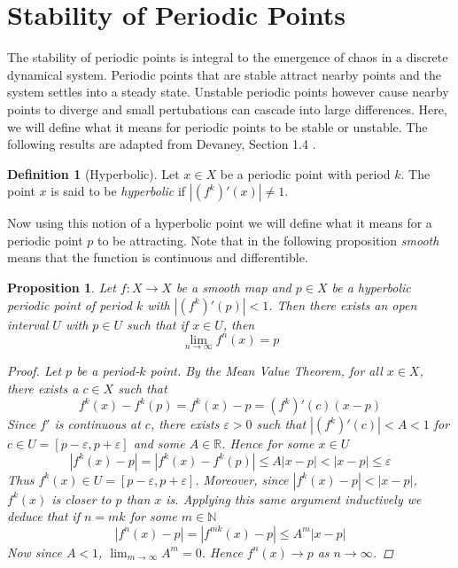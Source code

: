 \documentclass[11pt,a4paper,oneside]{memoir}
\theoremstyle{plain}
\newtheorem{prop}[thm]{Proposition}
\theoremstyle{definition}
\newtheorem{defn}[thm]{Definition}
\begin{document}
\section{Stability of Periodic Points}
The stability of periodic points is integral to the emergence of chaos in a discrete dynamical system. Periodic points that are stable attract nearby points and the system settles into a steady state. Unstable periodic points however cause nearby points to diverge and small pertubations can cascade into large differences. Here, we will define what it means for periodic points to be stable or unstable. The following results are adapted from Devaney, Section 1.4 \cite{devaney}.

\begin{defn}[Hyperbolic]
    Let $x \in X$ be a periodic point with period $k$. The point $x$ is said to be \emph{hyperbolic} if $|(f^k)'(x)| \neq 1$.
\end{defn}

Now using this notion of a hyperbolic point we will define what it means for a periodic point $p$ to be attracting. Note that in the following proposition \emph{smooth} means that the function is continuous and differentible.

\begin{prop} \label{prop:attractor}
    Let $f: X \to X$ be a smooth map and $p \in X$ be a hyperbolic periodic point of period $k$ with $|(f^k)'(p)| < 1$. Then there exists an open interval $U$ with $p \in U$ such that if $x \in U$, then \[ \lim_{n \to \infty} f^n(x) = p \]

    \begin{proof}
        Let $p$ be a period-$k$ point. By the Mean Value Theorem, for all $x \in X$, there exists a $c \in X$ such that \[f^k(x) - f^k(p) = f^k(x) - p = (f^k)'(c)(x-p)\] Since $f'$ is continuous at $c$, there exists $\varepsilon > 0$ such that $|(f^k)'(c)| < A < 1$ for $c \in U = [p - \varepsilon, p + \varepsilon]$ and some $A \in \mathbb{R}$. Hence for some $x \in U$ \[|f^k(x) - p| = |f^k(x) - f^k(p)| \leq A|x-p| < |x-p| \leq \varepsilon\] Thus $f^k(x) \in U = [p - \varepsilon, p + \varepsilon]$. Moreover, since $|f^k(x) - p| < |x - p|$, $f^k(x)$ is closer to $p$ than $x$ is. Applying this same argument inductively we deduce that if $n = mk$ for some $m \in \mathbb{N}$ \[|f^n(x) - p| = |f^{mk}(x) - p| \leq A^m|x - p|\] Now since $A < 1$, $\lim_{m \to \infty}A^m = 0$. Hence $f^n(x) \to p$ as $n \to \infty$. 
    \end{proof}
\end{prop}
\end{document}
